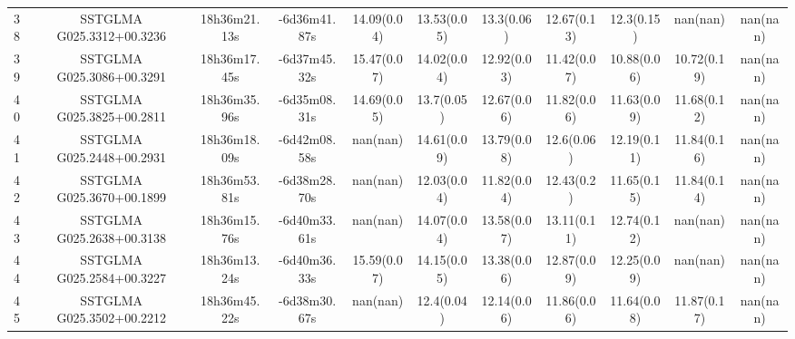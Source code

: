 \begin{table}
{{\begin{tabular}[c]{lcccccccccc}
38 & SSTGLMA G025.3312+00.3236 & 18h36m21.13s & -6d36m41.87s & 14.09(0.04) & 13.53(0.05) & 13.3(0.06)  & 12.67(0.13) & 12.3(0.15)  & nan(nan)    & nan(nan) \\
39 & SSTGLMA G025.3086+00.3291 & 18h36m17.45s & -6d37m45.32s & 15.47(0.07) & 14.02(0.04) & 12.92(0.03) & 11.42(0.07) & 10.88(0.06) & 10.72(0.19) & nan(nan) \\
40 & SSTGLMA G025.3825+00.2811 & 18h36m35.96s & -6d35m08.31s & 14.69(0.05) & 13.7(0.05)  & 12.67(0.06) & 11.82(0.06) & 11.63(0.09) & 11.68(0.12) & nan(nan) \\
41 & SSTGLMA G025.2448+00.2931 & 18h36m18.09s & -6d42m08.58s & nan(nan)    & 14.61(0.09) & 13.79(0.08) & 12.6(0.06)  & 12.19(0.11) & 11.84(0.16) & nan(nan) \\
42 & SSTGLMA G025.3670+00.1899 & 18h36m53.81s & -6d38m28.70s & nan(nan)    & 12.03(0.04) & 11.82(0.04) & 12.43(0.2)  & 11.65(0.15) & 11.84(0.14) & nan(nan) \\
43 & SSTGLMA G025.2638+00.3138 & 18h36m15.76s & -6d40m33.61s & nan(nan)    & 14.07(0.04) & 13.58(0.07) & 13.11(0.11) & 12.74(0.12) & nan(nan)    & nan(nan) \\
44 & SSTGLMA G025.2584+00.3227 & 18h36m13.24s & -6d40m36.33s & 15.59(0.07) & 14.15(0.05) & 13.38(0.06) & 12.87(0.09) & 12.25(0.09) & nan(nan)    & nan(nan) \\
45 & SSTGLMA G025.3502+00.2212 & 18h36m45.22s & -6d38m30.67s & nan(nan)    & 12.4(0.04)  &12.14(0.06)  & 11.86(0.06) & 11.64(0.08) & 11.87(0.17) & nan(nan) \\
\hline
\end{tabular}
}
}
\end{table}

